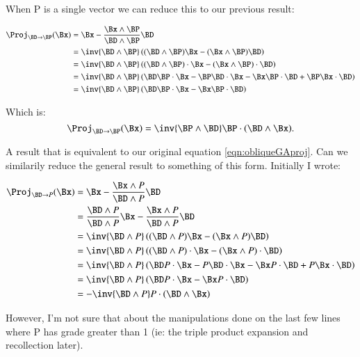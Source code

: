 \documentclass{article}      %
\begin{document}
When P is a single vector we can reduce this to our previous result:

\begin{align*}
\Proj_{\BD \rightarrow \BP}(\Bx) 
&= \Bx - \frac{\Bx \wedge \BP}{\BD \wedge \BP} \BD \\
&= \inv{\BD \wedge \BP} \left((\BD \wedge \BP)\Bx - (\Bx \wedge \BP) \BD \right) \\
&= \inv{\BD \wedge \BP} \left( (\BD \wedge \BP) \cdot \Bx - (\Bx \wedge \BP)  \cdot \BD \right) \\
&= \inv{\BD \wedge \BP} \left( \BD \BP \cdot \Bx -\BP \BD \cdot \Bx -\Bx \BP \cdot \BD +\BP \Bx \cdot \BD \right) \\
&= \inv{\BD \wedge \BP} \left( \BD \BP \cdot \Bx -\Bx \BP \cdot \BD \right) \\
\end{align*}

Which is:
\begin{equation}\label{eqn:followup}
\Proj_{\BD \rightarrow \BP}(\Bx) 
= \inv{\BP \wedge \BD} \BP \cdot ( \BD \wedge \Bx ).
\end{equation}

A result that is equivalent to our original equation \ref{eqn:obliqueGAproj}.  Can we similarily reduce the general result to something of this form.  Initially I wrote:

\begin{align*}
\Proj_{\BD \rightarrow P}(\Bx) 
&= \Bx - \frac{\Bx \wedge P}{\BD \wedge P} \BD \\
&= \frac{\BD \wedge P}{\BD \wedge P} \Bx - \frac{\Bx \wedge P}{\BD \wedge P} \BD \\
&= \inv{\BD \wedge P} \left( (\BD \wedge P) \Bx - (\Bx \wedge P) \BD \right) \\
&= \inv{\BD \wedge P} \left( (\BD \wedge P) \cdot \Bx - (\Bx \wedge P) \cdot \BD \right) \\
&= \inv{\BD \wedge P} \left( \BD P \cdot \Bx -P \BD \cdot \Bx - \Bx P \cdot \BD + P \Bx \cdot \BD \right) \\
&= \inv{\BD \wedge P} \left( \BD P \cdot \Bx - \Bx P \cdot \BD \right) \\ 
&= -\inv{\BD \wedge P} P \cdot (\BD \wedge \Bx ) \\
\end{align*}

However, I'm not sure that about the manipulations done on the last few lines where P has grade greater than 1 (ie: the triple product expansion and recollection later).
\end{document}

